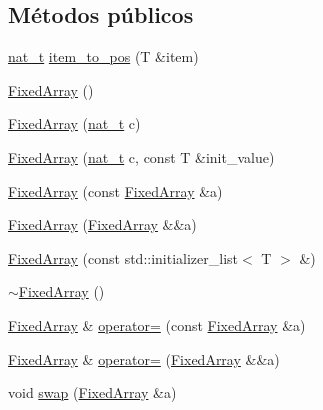 \subsection*{Métodos públicos}
\begin{DoxyCompactItemize}
\item 
\hyperlink{namespace_designar_aa72662848b9f4815e7bf31a7cf3e33d1}{nat\+\_\+t} \hyperlink{class_designar_1_1_fixed_array_af1c7e826a704015eab8f3accac7ead7d}{item\+\_\+to\+\_\+pos} (T \&item)
\item 
\hyperlink{class_designar_1_1_fixed_array_a493a48e7c23b6b882a96c5451d10248a}{Fixed\+Array} ()
\item 
\hyperlink{class_designar_1_1_fixed_array_ac3bed73485d717ddc1fc412d3e7fea58}{Fixed\+Array} (\hyperlink{namespace_designar_aa72662848b9f4815e7bf31a7cf3e33d1}{nat\+\_\+t} c)
\item 
\hyperlink{class_designar_1_1_fixed_array_a8d313d1c5d828b9a635cb7626e9a6cb2}{Fixed\+Array} (\hyperlink{namespace_designar_aa72662848b9f4815e7bf31a7cf3e33d1}{nat\+\_\+t} c, const T \&init\+\_\+value)
\item 
\hyperlink{class_designar_1_1_fixed_array_a0375e6a3b0eaabd87a044354866c557f}{Fixed\+Array} (const \hyperlink{class_designar_1_1_fixed_array}{Fixed\+Array} \&a)
\item 
\hyperlink{class_designar_1_1_fixed_array_ababc68b389c05fb8c819e5a77afeb626}{Fixed\+Array} (\hyperlink{class_designar_1_1_fixed_array}{Fixed\+Array} \&\&a)
\item 
\hyperlink{class_designar_1_1_fixed_array_aaf63fe5101e36f6f058d71eb7bcfcfcc}{Fixed\+Array} (const std\+::initializer\+\_\+list$<$ T $>$ \&)
\item 
\hyperlink{class_designar_1_1_fixed_array_adfe330be4cd4afd6a097cf5abd2cec38}{$\sim$\+Fixed\+Array} ()
\item 
\hyperlink{class_designar_1_1_fixed_array}{Fixed\+Array} \& \hyperlink{class_designar_1_1_fixed_array_ac7e23eebfa59ba27db48ebd401ea0c53}{operator=} (const \hyperlink{class_designar_1_1_fixed_array}{Fixed\+Array} \&a)
\item 
\hyperlink{class_designar_1_1_fixed_array}{Fixed\+Array} \& \hyperlink{class_designar_1_1_fixed_array_a5a358228f610390c3987883c09cf31f0}{operator=} (\hyperlink{class_designar_1_1_fixed_array}{Fixed\+Array} \&\&a)
\item 
void \hyperlink{class_designar_1_1_fixed_array_ab13ae0d1146e753d3e1128e1cce07d91}{swap} (\hyperlink{class_designar_1_1_fixed_array}{Fixed\+Array} \&a)
\item 

\end{DoxyCompactItemize}
